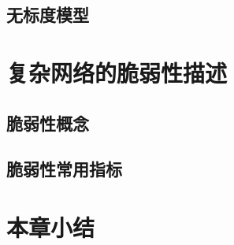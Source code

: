 \subsection{无标度模型}
\label{sec:windModel}



\section{复杂网络的脆弱性描述}
\label{sec:load}



\subsection{脆弱性概念}
\label{sec:loadEffect}




\subsection{脆弱性常用指标}
\label{sec:loadModel}




\section{本章小结}
\label{sec:sum2}





